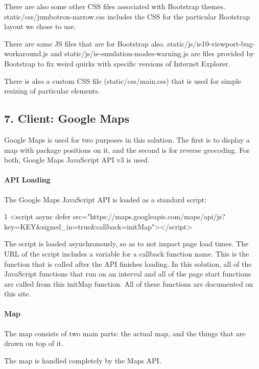 There are also some other C\+SS files associated with Bootstrap themes. {\ttfamily static/css/jumbotron-\/narrow.\+css} includes the C\+SS for the particular Bootstrap layout we chose to use.

There are some JS files that are for Bootstrap also. {\ttfamily static/js/ie10-\/viewport-\/bug-\/workaround.\+js} and {\ttfamily static/js/ie-\/emulation-\/modes-\/warning.\+js} are files provided by Bootstrap to fix weird quirks with specific versions of Internet Explorer.

There is also a custom C\+SS file ({\ttfamily static/css/main.\+css}) that is used for simple resizing of particular elements.

\subsection*{7. Client\+: Google Maps}

Google Maps is used for two purposes in this solution. The first is to display a map with package positions on it, and the second is for reverse geocoding. For both, Google Maps Java\+Script A\+PI v3 is used.

\paragraph*{A\+PI Loading}

The Google Maps Java\+Script A\+PI is loaded as a standard script\+: 
\begin{DoxyCode}
1 <script async defer
       src="https://maps.googleapis.com/maps/api/js?key=KEY&signed\_in=true&callback=initMap"></script>
\end{DoxyCode}
 The script is loaded asynchronously, so as to not impact page load times. The U\+RL of the script includes a variable for a callback function name. This is the function that is called after the A\+PI finishes loading. In this solution, all of the Java\+Script functions that run on an interval and all of the page start functions are called from this init\+Map function. All of these functions are documented on this site.

\paragraph*{Map}

The map consists of two main parts\+: the actual map, and the things that are drawn on top of it.

The map is handled completely by the Maps A\+PI.


